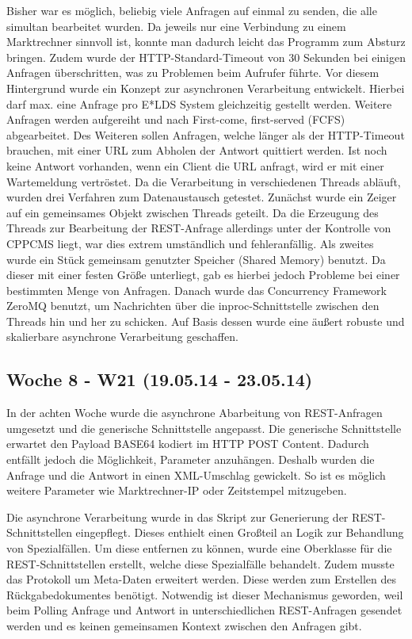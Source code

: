 \documentclass{article}
\begin{document}
Bisher war es möglich, beliebig viele Anfragen auf einmal zu senden, die alle simultan bearbeitet wurden. Da jeweils nur eine Verbindung zu einem Marktrechner sinnvoll ist, konnte man dadurch leicht das Programm zum Absturz bringen. Zudem wurde der HTTP-Standard-Timeout von 30 Sekunden bei einigen Anfragen überschritten, was zu Problemen beim Aufrufer führte. Vor diesem Hintergrund wurde ein Konzept zur asynchronen Verarbeitung entwickelt. Hierbei darf max. eine Anfrage pro E*LDS System gleichzeitig gestellt werden. Weitere Anfragen werden aufgereiht und nach First-come, first-served (FCFS) abgearbeitet. Des Weiteren sollen Anfragen, welche länger als der HTTP-Timeout brauchen, mit einer URL zum Abholen der Antwort quittiert werden. Ist noch keine Antwort vorhanden, wenn ein Client die URL anfragt, wird er mit einer Wartemeldung vertröstet. Da die Verarbeitung in verschiedenen Threads abläuft, wurden drei Verfahren zum Datenaustausch getestet. Zunächst wurde ein Zeiger auf ein gemeinsames Objekt zwischen Threads geteilt. Da die Erzeugung des Threads zur Bearbeitung der REST-Anfrage allerdings unter der Kontrolle von CPPCMS liegt, war dies extrem umständlich und fehleranfällig. Als zweites wurde ein Stück gemeinsam genutzter Speicher (Shared Memory) benutzt. Da dieser mit einer festen Größe unterliegt, gab es hierbei jedoch Probleme bei einer bestimmten Menge von Anfragen. Danach wurde das Concurrency Framework ZeroMQ benutzt, um Nachrichten über die inproc-Schnittstelle zwischen den Threads hin und her zu schicken. Auf Basis dessen wurde eine äußert robuste und skalierbare asynchrone Verarbeitung geschaffen.

\subsection{Woche 8 - W21 (19.05.14 - 23.05.14)}

In der achten Woche wurde die asynchrone Abarbeitung von REST-Anfragen umgesetzt und die generische Schnittstelle angepasst. Die generische Schnittstelle erwartet den Payload BASE64 kodiert im HTTP POST Content. Dadurch entfällt jedoch die Möglichkeit, Parameter anzuhängen. Deshalb wurden die Anfrage und die Antwort in einen XML-Umschlag gewickelt. So ist es möglich weitere Parameter wie Marktrechner-IP oder Zeitstempel mitzugeben.

Die asynchrone Verarbeitung wurde in das Skript zur Generierung der REST-Schnittstellen eingepflegt. Dieses enthielt einen Großteil an Logik zur Behandlung von Spezialfällen. Um diese entfernen zu können, wurde eine Oberklasse für die REST-Schnittstellen erstellt, welche diese Spezialfälle behandelt. Zudem musste das Protokoll um Meta-Daten erweitert werden. Diese werden zum Erstellen des Rückgabedokumentes benötigt. Notwendig ist dieser Mechanismus geworden, weil beim Polling Anfrage und Antwort in unterschiedlichen REST-Anfragen gesendet werden und es keinen gemeinsamen Kontext zwischen den Anfragen gibt.
\end{document}
